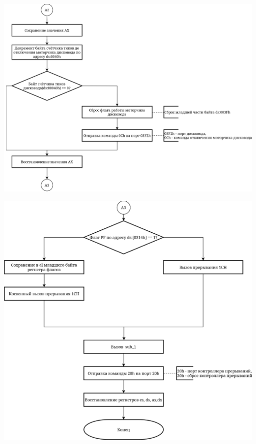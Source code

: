 \documentclass[a4paper,14pt]{article}
\begin{document}
	\pagebreak
	\begin{center}
	\includegraphics[height=0.5\textheight]{img/main3}
	\end{center}
	\pagebreak
	\begin{center}
	\includegraphics[height=0.6\textheight]{img/main4}
	\end{center}
	\pagebreak
\end{document}
